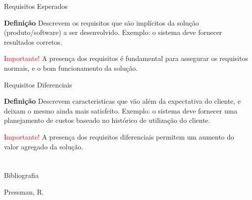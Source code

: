 \documentclass[xcolor=x11names,compress]{beamer}
\begin{document}
\begin{frame}{Requisitos Esperados}

\begin{alertblock}{\textbf{Definição}}
Descrevem os requisitos que são implícitos da solução (produto/software) a ser desenvolvido. Exemplo: o sistema deve fornecer resultados corretos.
\end{alertblock}

\pause

\begin{alertblock}{\centering \textcolor{red}{Importante!}}
A presença dos requisitos é fundamental para assegurar os requisitos normais, e o bom funcionamento da solução.
\end{alertblock}

\end{frame}

\begin{frame}{Requisitos Diferenciais}

\begin{alertblock}{\textbf{Definição}}
Descrevem caracteristicas que vão além da expectativa do cliente, e deixam o mesmo ainda mais satisfeito. Exemplo: o sistema deve fornecer uma planejamento de custos baseado no histórico de utilização do cliente.
\end{alertblock}

\pause

\begin{alertblock}{\centering \textcolor{red}{Importante!}}
A presença dos requisitos diferenciais permitem um aumento do valor agregado da solução.
\end{alertblock}

\end{frame}

\section{}

\begin{frame}{Bibliografia}

\begin{thebibliography}{Pressman, 2001}


Pressman, R.


\end{thebibliography}

\end{frame}
\end{document}

